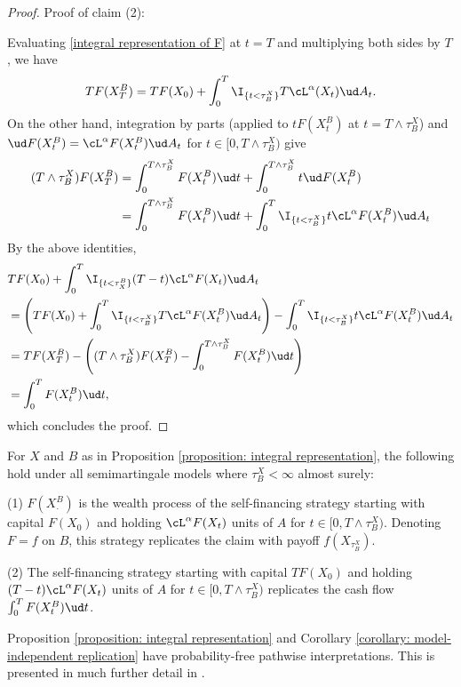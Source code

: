 \documentclass[11pt]{article}
\begin{document}
\begin{proof}
\item Proof of claim (2):

Evaluating \eqref{integral representation of F} at $t = T$ and multiplying both sides by $T$, we have
$$
TF(X^B_T) = T F(X_0) + \int_0^T \I_{\{t < \tau^X_B\}} T \cL^\alpha(X_t) \ud A_t.
$$
On the other hand, integration by parts (applied to $t F(X^B_t)$ at $t = T \wedge \tau^X_B$) and $\ud F(X^B_t) = \cL^\alpha F(X^B_t) \ud A_t$ for $t \in [0, T \wedge \tau^X_B)$ give
\begin{align*}
(T \wedge \tau^X_B) F(X^B_T) &= \int_0^{T \wedge \tau^X_B} F(X^B_t) \ud t + \int_0^{T \wedge \tau^X_B} t \ud F(X^B_t) \\
&= \int_0^{T \wedge \tau^X_B} F(X^B_t) \ud t + \int_0^T \I_{\{t < \tau^X_B\}} t \cL^\alpha F(X^B_t) \ud A_t
\end{align*}
By the above identities,
\begin{align*}
&T F(X_0) + \int_0^T \I_{\{t < \tau^B_X\}} (T-t) \cL^\alpha F(X_t) \ud A_t \\
&= \left( T F(X_0) + \int_0^T \I_{\{t < \tau^X_B\}} T \cL^\alpha F(X^B_t) \ud A_t \right) - \int_0^T \I_{\{t < \tau^X_B\}} t \cL^\alpha F(X^B_t) \ud A_t \\
&= T F(X^B_T) - \left( (T \wedge \tau^X_B) F(X^B_T) - \int_0^{T \wedge \tau^X_B} F(X^B_t) \ud t \right) \\
&=  \int_0^T F(X^B_t) \ud t,
\end{align*}
which concludes the proof.

\end{proof}

\begin{corollary}
\label{corollary: model-independent replication}
For $X$ and $B$ as in Proposition \ref{proposition: integral representation}, the following hold under all semimartingale models where $\tau^X_B < \infty$ almost surely:
\item (1) $F(X^B_\cdot)$ is the wealth process of the self-financing strategy starting with capital $F(X_0)$ and holding $\cL^\alpha F(X_t)$ units of $A$ for $t \in [0,T \wedge \tau^X_B)$. Denoting $F = f$ on $B$, this strategy replicates the claim with payoff $f(X_{\tau^X_B})$.
\item (2) The self-financing strategy starting with capital $T F(X_0)$ and holding $(T-t) \cL^\alpha F(X_t)$ units of $A$ for $t \in [0, T \wedge \tau^X_B)$ replicates the cash flow $\int_0^T F(X^B_t) \ud t$.
\end{corollary}

Proposition \ref{proposition: integral representation} and Corollary \ref{corollary: model-independent replication} have probability-free pathwise interpretations. This is presented in much further detail in \cite{Atoyan}.
\end{document}
